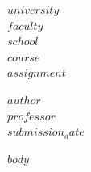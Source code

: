 \documentclass[12pt]{scrreprt}
\begin{document}
\begin{center}
    {\bfseries \Large $university$}\\[0.3cm]
    {\bfseries \large $faculty$}\\[0.2cm]
    {\bfseries $school$}\\[1.5cm]

    {\bfseries \large $course$}\\[1cm]

    {\bfseries \Large $assignment$}\\[1.5cm]
\end{center}

 $author$ \\
 $professor$ \\
 $submission_date$ \\

\vspace{1cm}

\doublespacing
\setlength{\parindent}{1.27cm}

$body$
\end{document}
